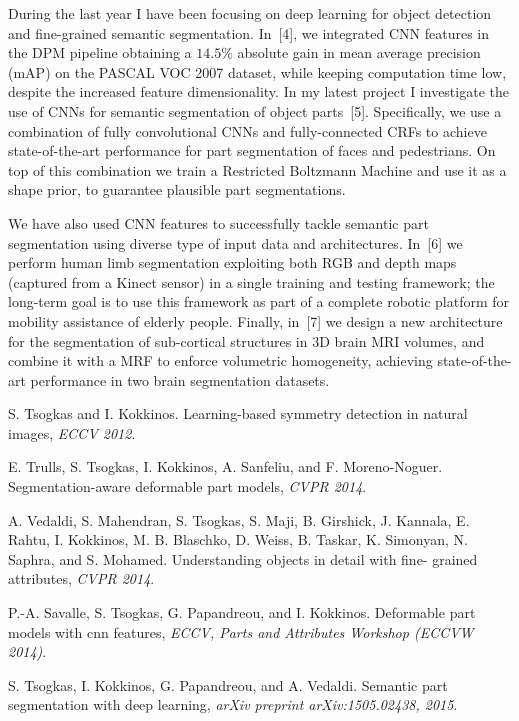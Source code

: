 \documentclass[margin]{res}
\begin{document}
\begin{resume}
During the last year I have been focusing on deep learning for object detection and fine-grained semantic segmentation. In~[4], we integrated CNN features in the DPM pipeline obtaining a $14.5\%$ absolute gain in mean average precision (mAP) on the PASCAL VOC 2007 dataset, while keeping computation time low, despite the increased feature dimensionality. In my latest project I investigate the use of CNNs for semantic segmentation of object parts~[5]. Specifically, we use a combination of fully convolutional CNNs and fully-connected CRFs to achieve state-of-the-art performance for part segmentation of faces and pedestrians. On top of this combination we train a Restricted Boltzmann Machine and use it as a shape prior, to guarantee plausible part segmentations.

We have also used CNN features to successfully tackle semantic part segmentation using diverse type of input data and architectures. In~[6] we perform human limb segmentation exploiting both RGB and depth maps (captured from a Kinect sensor) in a single training and testing framework; the long-term goal is to use this framework as part of a complete robotic platform for mobility assistance of elderly people. Finally, in~[7] we design a new architecture for the segmentation of sub-cortical structures in 3D brain MRI volumes, and combine it with a MRF to enforce volumetric homogeneity, achieving state-of-the-art performance in two brain segmentation datasets.  

\begin{thebibliography}{7}
 S. Tsogkas and I. Kokkinos. Learning-based symmetry detection in natural images, \emph{ECCV 2012}.

  E. Trulls, S. Tsogkas, I. Kokkinos, A. Sanfeliu, and F. Moreno-Noguer.
Segmentation-aware deformable part models, \emph{CVPR 2014}.

 A. Vedaldi, S. Mahendran, S. Tsogkas, S. Maji, B. Girshick, J. Kannala,
E. Rahtu, I. Kokkinos, M. B. Blaschko, D. Weiss, B. Taskar, K. Simonyan,
N. Saphra, and S. Mohamed. Understanding objects in detail with fine-
grained attributes, \emph{CVPR 2014}.

 P.-A. Savalle, S. Tsogkas, G. Papandreou, and I. Kokkinos. Deformable
part models with cnn features, \emph{ECCV, Parts and Attributes Workshop
 (ECCVW 2014)}.

 S. Tsogkas, I. Kokkinos, G. Papandreou, and A. Vedaldi. Semantic part
segmentation with deep learning, \emph{arXiv preprint arXiv:1505.02438, 2015}.


\end{thebibliography}
\end{resume}
\end{document}
